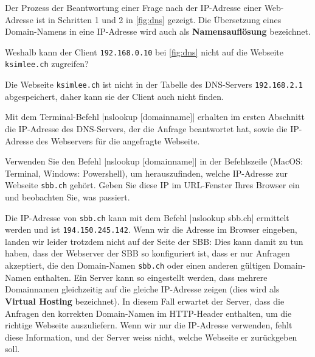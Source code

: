 Der Prozess der Beantwortung einer Frage nach der IP-Adresse einer Web-Adresse ist in Schritten 1 und 2 in \cref{fig:dns} gezeigt. Die Übersetzung eines Domain-Namens in eine \gls{IP}-Adresse wird auch als \textbf{Namensauflösung} bezeichnet.

\begin{myexercise}
	Weshalb kann der Client \texttt{192.168.0.10} bei \cref{fig:dns} nicht auf die Webseite \texttt{ksimlee.ch} zugreifen?
	\begin{myanswer}
		Die Webseite \texttt{ksimlee.ch} ist nicht in der Tabelle des \gls{DNS}-Servers \texttt{192.168.2.1} abgespeichert, daher kann sie der Client auch nicht finden.
	\end{myanswer}
\end{myexercise}




Mit dem Terminal-Befehl \commandbox*|nslookup [domainname]| erhalten im ersten Abschnitt die \gls{IP}-Adresse des \gls{DNS}-Servers, der die Anfrage beantwortet hat, sowie die \gls{IP}-Adresse des Webservers für die angefragte Webseite.


\begin{myexercise}
	Verwenden Sie den Befehl \commandbox*|nslookup [domainname]| in der Befehlszeile (MacOS: Terminal, Windows: Powershell), um herauszufinden, welche \gls{IP}-Adresse zur Webseite \texttt{sbb.ch} gehört. Geben Sie diese \gls{IP} im URL-Fenster Ihres Browser ein und beobachten Sie, was passiert.
	\begin{myanswer}
		Die IP-Adresse von \texttt{sbb.ch} kann mit dem Befehl \commandbox*|nslookup sbb.ch| ermittelt werden und ist \texttt{194.150.245.142}. Wenn wir die Adresse im Browser eingeben, landen wir leider trotzdem nicht auf der Seite der SBB: Dies kann damit zu tun haben, dass der Webserver der SBB so konfiguriert ist, dass er nur Anfragen akzeptiert, die den Domain-Namen \texttt{sbb.ch} oder einen anderen gültigen Domain-Namen enthalten. Ein Server kann so eingestellt werden, dass mehrere Domainnamen gleichzeitig auf die gleiche IP-Adresse zeigen (dies wird als \textbf{Virtual Hosting} bezeichnet). In diesem Fall erwartet der Server, dass die Anfragen den korrekten Domain-Namen im \gls{HTTP}-Header enthalten, um die richtige Webseite auszuliefern. Wenn wir nur die IP-Adresse verwenden, fehlt diese Information, und der Server weiss nicht, welche Webseite er zurückgeben soll.
	\end{myanswer}
\end{myexercise}

